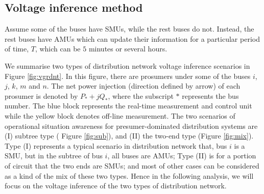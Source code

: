 \documentclass{article}
\begin{document}
\subsection{Voltage inference method}
Assume some of the buses have SMUs,  while the rest buses do not. Instead, the rest buses have AMUs which can update their information for a particular period of time, $T$, which can be $5$ minutes or several hours.

We summarise two types of distribution network voltage inference scenarios in Figure \ref{fig:vgrdnt}. In this figure, there are prosumers under some of the buses $i$, $j$, $k$, $m$ and $n$. The net power injection (direction defined by arrow) of each prosumer is denoted by $P_*+jQ_*$, where the subscript $*$ represents the bus number. The blue block represents the real-time measurement and control unit while the yellow block denotes off-line measurement. The two scenarios of operational situation awareness for presumer-dominated distribution systems are (I) subtree type ( Figure \ref{fig:sub}), 
 and (II) the two-end type (Figure \ref{fig:mix}). Type (I) represents a typical scenario in distribution network that, bus $i$ is a SMU, but in the subtree of bus $i$, all buses are AMUs; Type (II) is for a portion of circuit that the two ends are SMUs; and most of other cases can be considered as a kind of the mix of these two types. Hence in the following analysis, we will focus on the voltage inference of the two types of distribution network. 
\end{document}
